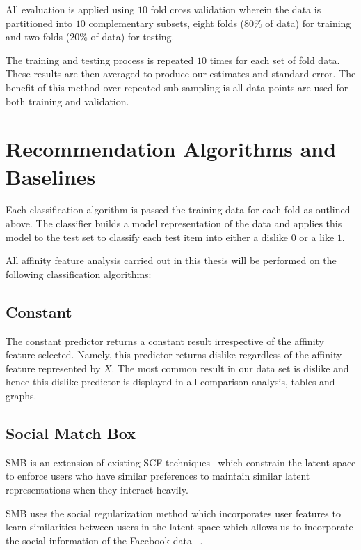 All evaluation is applied using $10$ fold cross validation wherein the data is partitioned into $10$ complementary subsets, 
eight folds ($80\%$ of data) for training and two folds ($20\%$ of data) for testing.

The training and testing process is repeated $10$ times for each set of fold data. These results are then averaged to produce our 
estimates and standard error. The benefit of this method over repeated sub-sampling is all data points are used for both training 
and validation.

\section{Recommendation Algorithms and Baselines}
\label{sec:meth}

Each classification algorithm is passed the training data for each fold as outlined above. The classifier 
builds a model representation of the data and applies this model to the test set to classify each test item into either a dislike $0$ or 
a like $1$.

All affinity feature analysis carried out in this thesis will be performed on the following classification algorithms:

\subsection{Constant}
\label{sec:const}

The constant predictor returns a constant result irrespective of the affinity feature selected. Namely, this predictor returns dislike
regardless of the affinity feature represented by $X$. The most common result in our data set is dislike and hence this dislike 
predictor is displayed in all comparison analysis, tables and graphs.

\subsection{Social Match Box}
\label{sec:sr}

SMB is an extension of existing SCF techniques~\cite{lla,socinf} which constrain the latent space to enforce users 
who have similar preferences to maintain similar latent representations when they interact heavily.

SMB uses the social regularization method which incorporates user features to learn
similarities between users in the latent space which allows us to incorporate the social information of the Facebook data ~\cite{joseph}.


